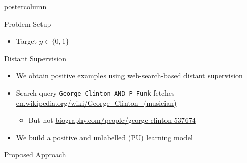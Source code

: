 \documentclass{beamer}
\begin{document}
\begin{frame}
\begin{columns}
\begin{column}{.5\textwidth}
\begin{beamercolorbox}[center]{postercolumn}
\begin{minipage}{.98\textwidth}
{\begin{myblock}{Problem Setup}
\begin{itemize}
\begin{itemize}
\item Target $y \in \{0,1\}$ 
	\end{itemize}     		
	\end{itemize}     		
    				\end{myblock}\vfill
					\begin{myblock}{Distant Supervision}

\vspace{0.5em}

              \begin{itemize}
		\item  We obtain positive examples using web-search-based distant supervision
		\item  Search query {\color{gray} \tt George Clinton AND P-Funk} fetches {\small \color{blue} \url{en.wikipedia.org/wiki/George_Clinton_(musician)}}
		\begin{itemize}
		\item But not {\small \color{blue} \url{biography.com/people/george-clinton-537674}}
     \end{itemize}     
		\item  We build a positive and unlabelled (PU) learning model
     \end{itemize}     
						\vspace{0.5em}
			
					\end{myblock}\vfill
					\begin{myblock}{Proposed Approach}


\end{myblock}}
\end{minipage}
\end{beamercolorbox}
\end{column}
\end{columns}
\end{frame}
\end{document}
